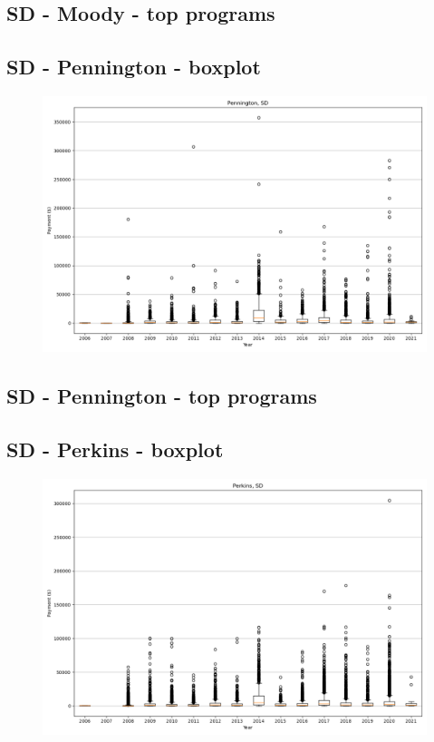 \subsection*{SD - Moody - top programs}

\newpage
\subsection*{SD - Pennington - boxplot}
\begin{figure}[h]
\centering
\includegraphics[width=7in]{../output/boxplots/counties/Pennington-SD_boxplot.png}
\end{figure}


\subsection*{SD - Pennington - top programs}

\newpage
\subsection*{SD - Perkins - boxplot}
\begin{figure}[h]
\centering
\includegraphics[width=7in]{../output/boxplots/counties/Perkins-SD_boxplot.png}
\end{figure}


